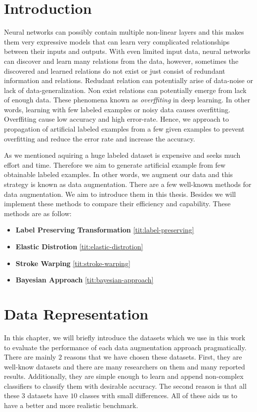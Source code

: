 \chapter{Introduction}

Neural networks can possibly contain multiple non-linear layers and this makes them very expressive models
that can learn very complicated relationships between their inputs and outputs. With even limited
input data, neural networks can discover and learn many relations from the data, however, sometimes the
discovered and learned relations do not exist or just consist of redundant information and
relations. Redudant relation can potentially arise of data-noise or lack of data-generalization. Non
exist relations can potentially emerge from lack of enough data. These phenomena known as
\textit{overffiting} in deep learning. In other words, learning with few labeled examples or noisy
data causes overfitting. Overffiting cause low accuracy and high error-rate. Hence, we approach to propagation of artificial
labeled examples from a few given examples to prevent overfitting and reduce the error rate and increase
the accuracy.

As we mentioned aquiring a huge labeled dataset is expensive and seeks much effort and time. Therefore we aim to generate artificial example from few obtainable labeled examples. In other words, we
augment our data and this strategy is known as data augmentation. There are a few well-known methods for data augmentation. We aim to introduce them in this thesis.  Besides we will implement these
methods to compare their efficiency and capability. These methods are as follow:
\begin{itemize}
  \item \textbf{Label Preserving Transformation} \ref{tit:label-preserving}
  \item \textbf{Elastic Distrotion} \ref{tit:elastic-distrotion}
  \item \textbf{Stroke Warping} \ref{tit:stroke-warping}
  \item \textbf{Bayesian Approach} \ref{tit:bayesian-approach}
\end{itemize}



\chapter{Data Representation}
\label{tit:data-representation}
In this chapter, we will briefly introduce the datasets which we use in this work to evaluate the
performance of each data augmentation approach pragmatically. There are mainly $2$ reasons that we
have chosen these datasets. First, they are well-know datasets and there are many researchers on
them and many reported results. Additionally, they are simple enough to learn and append non-complex
classifiers to classify them with desirable accuracy. The second reason is that all these $3$
datasets have $10$ classes with small differences. All of these aids us to have a better and more
realistic benchmark. 

